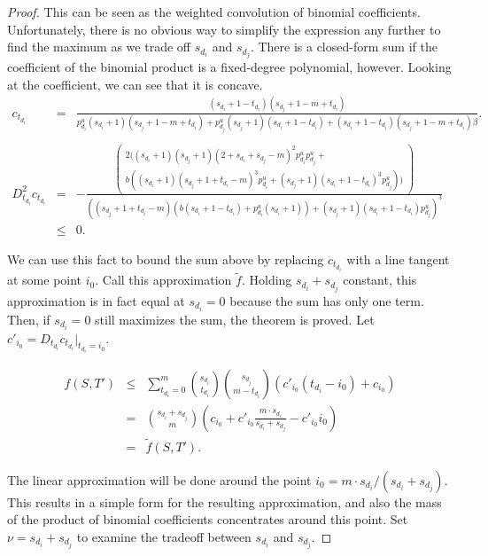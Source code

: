 \documentclass[prodmode,acmtissec]{acmsmall}
\begin{document}
\begin{proof}
This can be seen as the weighted convolution of binomial coefficients.  Unfortunately, there is no obvious way to simplify the expression any further to find the maximum as we trade off $s_{d_i}$ and $s_{d_j}$.  There is a closed-form sum if the coefficient of the binomial product is a fixed-degree polynomial, however.  Looking at the coefficient, we can see that it is concave.
\begin{displaymath}
  \begin{array}{lll}
    c_{t_{d_i}} &= &\frac{(s_{d_i}+1-t_{d_i})(s_{d_j}+1-m+t_{d_i})}{p^u_{d_i}(s_{d_i}+1)(s_{d_j}+1-m+t_{d_i}) + p^u_{d_j}(s_{d_j}+1)(s_{d_i}+1-t_{d_i}) + (s_{d_i}+1-t_{d_i})(s_{d_j}+1-m+t_{d_i})\beta}.\\
& & \\
    D^2_{t_{d_i}} c_{t_{d_i}} &= &-\frac{\left( \begin{array}{l} 2((s_{d_i}+1)(s_{d_j}+1)(2+s_{d_i}+s_{d_j}-m)^2 p^u_{d_i}p^u_{d_j}+ \\ b((s_{d_i}+1)(s_{d_j}+1+t_{d_i}-m)^3 p^u_{d_i} +  (s_{d_j}+1)(s_{d_i}+1-t_{d_i})^3 p^u_{d_j})) \end{array} \right) }
{((s_{d_j}+1+t_{d_i}-m)(b(s_{d_i}+1-t_{d_i})+p^u_{d_i}(s_{d_i}+1)) + (s_{d_j}+1)(s_{d_i}+1-t_{d_i}) p^u_{d_j})^3}\\
    &\le &0.
  \end{array}
\end{displaymath}

We can use this fact to bound the sum above by replacing $c_{t_{d_i}}$ with a line tangent at some point $i_0$.  Call this approximation $\tilde{f}$.  Holding $s_{d_i}+s_{d_j}$ constant, this approximation is in fact equal at $s_{d_i}=0$ because the sum has only one term.  Then, if $s_{d_i}=0$ still maximizes the sum, the theorem is proved.  Let $c'_{i_0} = D_{t_{d_i}} c_{t_{d_i}} \big|_{t_{d_i}=i_0}$.

\begin{eqnarray*}
  f(S,T') &\le& \sum_{t_{d_i}=0}^m \binom{s_{d_i}}{t_{d_i}} \binom{s_{d_j}}{m-t_{d_i}}(c'_{i_0}(t_{d_i}-i_0)+c_{i_0})\\
          &=& \binom{s_{d_i}+s_{d_j}}{m} \left(c_{i_0} + c'_{i_0} \frac{m \cdot s_{d_i}}{s_{d_i}+s_{d_j}} - c'_{i_0} i_0 \right)\\
          &=& \tilde{f}(S,T').
\end{eqnarray*}

The linear approximation will be done around the point $i_0 = m \cdot s_{d_i}/(s_{d_i}+s_{d_j})$.  This results in a simple form for the resulting approximation, and also the mass of the product of binomial coefficients concentrates around this point.  Set $\nu = s_{d_i}+s_{d_j}$ to examine the tradeoff between $s_{d_i}$ and $s_{d_j}$.


\end{proof}
\end{document}
